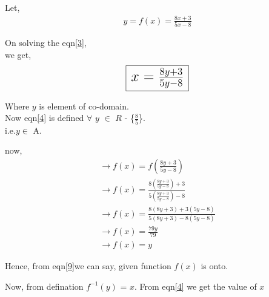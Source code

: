 \documentclass[journal,12pt,twocolumn]{IEEEtran}
\begin{document}
\vspace{5mm}
\vspace{5mm}

\noindent Let,
\begin{align} \label{3}
y = f(x) = \frac{8x+3}{5x-8}
\end{align}

On solving the eqn\eqref{3},\\ we get,
\begin{align} \label{4}
\LARGE\framebox[1.2\width]{$x$ = $\frac{8y+3}{5y-8}$}
\end{align}

Where $y$ is element of co-domain.\\ Now eqn\eqref{4} is defined $\forall$ $y$ $\in$ $R$ - \{$\frac{8}{5}$\}.\\ i.e.$y \in$ A.
\vspace{5mm}

\noindent now,
\begin{align}
\rightarrow f(x) = f(\frac{8y+3}{5y-8}) \\
\rightarrow f(x) = \frac{8(\frac{8y+3}{5y-8})+3}{5(\frac{8y+3}{5y-8})-8} \\
\rightarrow f(x) = \frac{8(8y+3)+3(5y-8)}{5(8y+3)-8(5y-8)}\\
\rightarrow f(x)=\frac{79y}{79} \\
\rightarrow f(x) = y \label{9}
\end{align}

\noindent Hence, from eqn\eqref{9}we can say, given function $f(x)$ is onto.
\vspace{5mm}

\vspace{5mm}

\noindent Now, from defination $f^{-1}(y)$ = $x$. From eqn\eqref{4} we get the value of $x$ 
\end{document}
